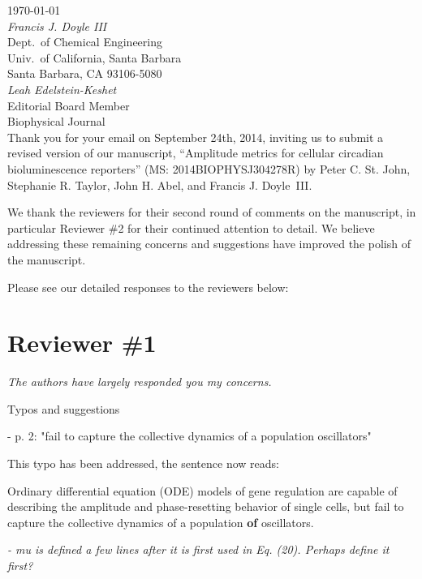 \documentclass[11pt, letterpaper]{article}
\newenvironment{reviewer}{\itshape\color{gray}}{}
\newenvironment{manuscript}[1]{\begin{center}\begin{tcolorbox}[colback=green!5!white,colframe=green!75!black,width=0.8\textwidth,title={#1},breakable,fonttitle=\bfseries]}{\end{tcolorbox}\end{center}}
\begin{document}
\today\\

{\itshape Francis J. Doyle III}\\
Dept.\ of Chemical Engineering\\
Univ.\ of California, Santa Barbara\\
Santa Barbara, CA 93106-5080\\

{\itshape Leah Edelstein-Keshet}\\
Editorial Board Member\\
Biophysical Journal\\

Thank you for your email on September 24th, 2014, inviting us to submit a revised version of our manuscript, ``Amplitude metrics for cellular circadian bioluminescence reporters'' (MS: 2014BIOPHYSJ304278R) by Peter C. St. John, Stephanie R. Taylor, John H. Abel, and Francis J. Doyle~III.

We thank the reviewers for their second round of comments on the manuscript, in particular Reviewer \#2 for their continued attention to detail. We believe addressing these remaining concerns and suggestions have improved the polish of the manuscript.

Please see our detailed responses to the reviewers below: 

\section*{Reviewer \#1}
\begin{reviewer}
The authors have largely responded you my concerns. 
 
Typos and suggestions 
 
- p. 2: "fail to capture the collective dynamics of a population oscillators" 
\end{reviewer}

This typo has been addressed, the sentence now reads:

\begin{manuscript}{Page 2}
  Ordinary differential equation (ODE) models of gene regulation are capable of describing the amplitude and phase-resetting behavior of single cells, but fail to capture the collective dynamics of a population {\bfseries of} oscillators.
\end{manuscript}
 
\begin{reviewer}
- mu is defined a few lines after it is first used in Eq. (20). Perhaps define it first? 
\end{reviewer}
\end{document}
